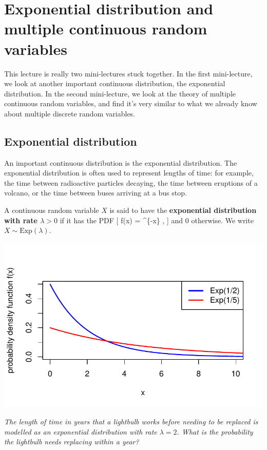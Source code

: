 \documentclass[
  letterpaper,
]{report}
\theoremstyle{definition}
\theoremstyle{definition}
\theoremstyle{remark}
\begin{document}
\hypertarget{L17-exp-multiple}{%
\chapter{Exponential distribution and multiple continuous random
variables}\label{L17-exp-multiple}}

This lecture is really two mini-lectures stuck together. In the first
mini-lecture, we look at another important continuous distribution, the
exponential distribution. In the second mini-lecture, we look at the
theory of multiple continuous random variables, and find it's very
similar to what we already know about multiple discrete random
variables.

\hypertarget{exponential}{%
\section{Exponential distribution}\label{exponential}}

An important continuous distribution is the exponential distribution.
The exponential distribution is often used to represent lengths of time:
for example, the time between radioactive particles decaying, the time
between eruptions of a volcano, or the time between buses arriving at a
bus stop.

A continuous random variable \(X\) is said to have the
\textbf{exponential distribution with rate \(\lambda > 0\)} if it has
the PDF {[} f(x) = \lambda {}\^{}\{-\lambda x\}
\qquad {}, {]} and 0 otherwise. We write
\(X \sim \text{Exp}(\lambda)\).

\includegraphics{sections/L16-exponential-multi_files/figure-pdf/exp-pic-1.pdf}

\emph{The length of time in years that a lightbulb works before needing
to be replaced is modelled as an exponential distribution with rate
\(\lambda = 2\). What is the probability the lightbulb needs replacing
within a year?}
\end{document}
